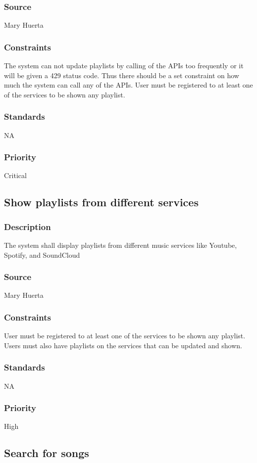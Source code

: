 \subsubsection{Source}
Mary Huerta
\subsubsection{Constraints}
The system can not update playlists by calling of the APIs too frequently or it will be given a 429 status code. Thus there should be a set constraint on how much the system can call any of the APIs. User must be registered to at least one of the services to be shown any playlist.
\subsubsection{Standards}
NA
\subsubsection{Priority}
Critical


\subsection{Show playlists from different services}
\subsubsection{Description}
The system shall display playlists from different music services like Youtube, Spotify, and SoundCloud
\subsubsection{Source}
Mary Huerta
\subsubsection{Constraints}
User must be registered to at least one of the services to be shown any playlist. Users must also have playlists on the services that can be updated and shown.
\subsubsection{Standards}
NA
\subsubsection{Priority}
High



\subsection{Search for songs}
